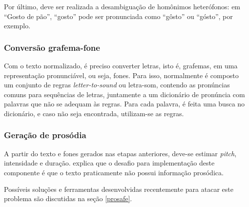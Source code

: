 Por último, deve ser realizada a desambiguação de homônimos heterófonos: em
``Gosto de pão'', ``gosto'' pode ser pronunciada como ``gôsto'' ou ``gósto'',
por exemplo.

\subsubsection{Conversão grafema-fone}
Com o texto normalizado, é preciso converter letras, isto é, grafemas, em uma
representação pronunciável, ou seja, fones. Para isso, normalmente é composto um
conjunto de regras \emph{letter-to-sound} ou letra-som, contendo as pronúncias
comuns para sequências de letras, juntamente a um dicionário de pronúncia com
palavras que não se adequam às regras. Para cada palavra, é feita uma busca no
dicionário, e caso não seja encontrada, utilizam-se as regras.

\subsubsection{Geração de prosódia}
\label{gerpros}
A partir do texto e fones gerados nas etapas anteriores, deve-se estimar
\emph{pitch}, intensidade e duração.  explica que o
desafio para implementação deste componente é que o texto praticamente não
possui informação prosódica.


Possíveis soluções e ferramentas desenvolvidas recentemente para atacar este
problema são discutidas na seção \ref{prosafe}.

